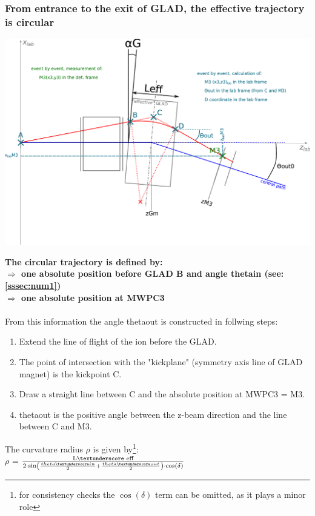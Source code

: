 \documentclass[12pt, letterpaper]{article}
\begin{document}
\subsubsection{From entrance to the exit of GLAD, the effective trajectory is circular}
\begin{center}
	\includegraphics[width=1.0\textwidth]{tracking_GLAD.png}
\end{center}
\textbf{The circular trajectory is defined by:\\
$\Rightarrow$ one absolute position before GLAD B and angle theta\textunderscore in (see: \ref{sssec:num1})\\
$\Rightarrow$ one absolute position at MWPC3}\\
\\
From this information the angle theta\textunderscore out is constructed in follwing steps:\\
\begin{enumerate}
	\item Extend the line of flight of the ion before the GLAD.
	\item The point of intersection with the "kickplane" (symmetry axis line of GLAD magnet) is the kickpoint C.
	\item Draw a straight line between C and the absolute position at MWPC3 = M3.
	 \item theta\textunderscore out is the positive angle between the z-beam direction and the line between C and M3.
\end{enumerate}
The curvature radius $\rho$ is given by\footnote{for consistency checks the $\cos(\delta)$ term can be omitted, as it plays a minor role}:\\
$\rho$ = $\frac{\textrm{L\textunderscore eff}}{2\cdot\sin\left(\frac{theta\textunderscore in}{2} +\frac{theta\textunderscore out}{2}\right)\cdot\cos(\delta)}$\\
\end{document}

